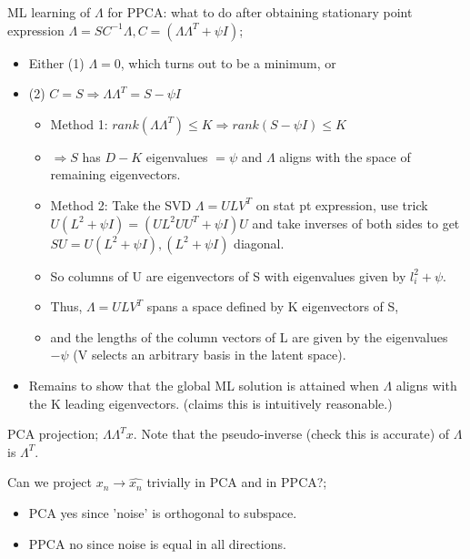 \documentclass{article}
\begin{document}
ML learning of $\Lambda$ for PPCA: what to do after obtaining stationary point expression $\Lambda = SC^{-1}\Lambda, C=(\Lambda\Lambda^T+\psi I)$; \begin{itemize} \item Either (1) $\Lambda=0$, which turns out to be a minimum, or \item (2) $C=S \Rightarrow \Lambda\Lambda^T=S-\psi I$ \begin{itemize} \item Method 1: $rank(\Lambda\Lambda^T)\leq K\Rightarrow rank(S-\psi I) \leq K$ \item $\Rightarrow S$ has $D-K$ eigenvalues $=\psi$ and $\Lambda$ aligns with the space of remaining eigenvectors.  \item Method 2: Take the SVD $\Lambda = ULV^T$ on stat pt expression, use trick $U(L^2+\psi I)=(UL^2UU^T+\psi I)U$ and take inverses of both sides to get $SU=U(L^2+\psi I), (L^2+\psi I)$ diagonal.  \item So columns of U are eigenvectors of S with eigenvalues given by $l^2_i + \psi$.  \item Thus, $\Lambda = ULV^T$ spans a space defined by K eigenvectors of S, \item and the lengths of the column vectors of L are given by the eigenvalues $-\psi$ (V selects an arbitrary basis in the latent space).  \end{itemize} \item Remains to show that the global ML solution is attained when $\Lambda$ aligns with the K leading eigenvectors. (claims this is intuitively reasonable.) \end{itemize}

PCA projection; $\Lambda\Lambda^Tx$. Note that the pseudo-inverse (check this is accurate) of $\Lambda$ is $\Lambda^T$.

Can we project $x_n \rightarrow \hat{x_n}$ trivially in PCA and in PPCA?; \begin{itemize} \item PCA yes since 'noise' is orthogonal to subspace.  \item PPCA no since noise is equal in all directions.  \end{itemize} 
\end{document}
